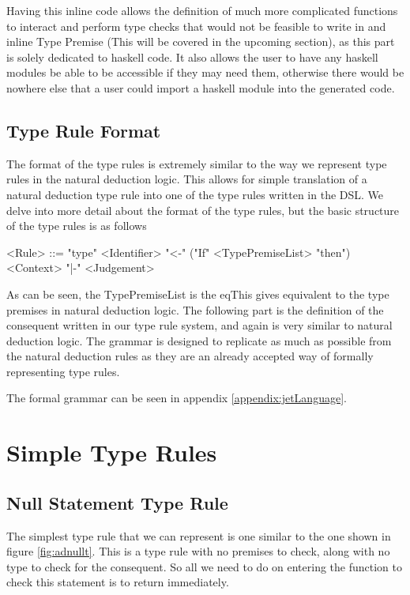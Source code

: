 Having this inline code allows the definition of much more complicated functions to interact and perform type checks that would not be feasible to write in and inline Type Premise (This will be covered in the upcoming section), as this part is solely dedicated to haskell code.
It also allows the user to have any haskell modules be able to be accessible if they may need them, otherwise there would be nowhere else that a user could import a haskell module into the generated code. 

\subsection{Type Rule Format}

The format of the type rules is extremely similar to the way we represent type rules in the natural deduction logic.
This allows for simple translation of a natural deduction type rule into one of the type rules written in the DSL.
We delve into more detail about the format of the type rules, but the basic structure of the type rules is as follows
\begin{grammar}
<Rule> ::= "type" <Identifier> "<-" ("If" <TypePremiseList> "then") 
    \\ <Context> "|-" <Judgement>
\end{grammar}

As can be seen, the TypePremiseList is the eqThis gives equivalent to the type premises in natural deduction logic.
The following part is the definition of the consequent written in our type rule system, and again is very similar to natural deduction logic.
The grammar is designed to replicate as much as possible from the natural deduction rules as they are an already accepted way of formally representing type rules.

The formal grammar can be seen in appendix \ref{appendix:jetLanguage}.

\section{Simple Type Rules}
\subsection{Null Statement Type Rule}
The simplest type rule that we can represent is one similar to the one shown in figure \ref{fig:adnullt}.
This is a type rule with no premises to check, along with no type to check for the consequent.
So all we need to do on entering the function to check this statement is to return immediately.

